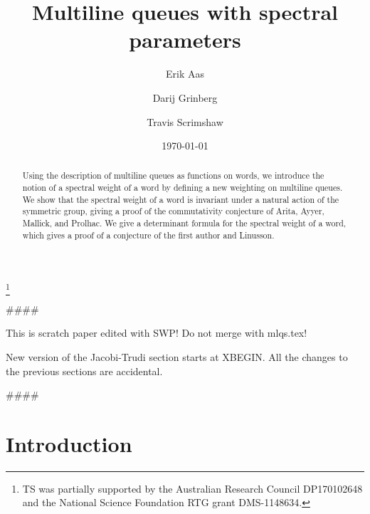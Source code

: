 \documentclass[reqno]{amsart}%
\newcommand{\0}{\phantom{c}}
\theoremstyle{plain}
\theoremstyle{definition}
\numberwithin{equation}{section}
\begin{document}
\title[MLQs]{Multiline queues with spectral parameters}
\author[E.~Aas]{Erik Aas}
\address[E. Aas]{Department of Mathematics, Pennsylvania State University, McAllister
Building, State College, PA 116802, USA}
\author[D.~Grinberg]{Darij Grinberg}
\address[D. Grinberg]{School of Mathematics, University of Minnesota, 206 Church St.
SE, Minneapolis, MN 55455}
\author[T.~Scrimshaw]{Travis Scrimshaw}
\address[T. Scrimshaw]{School of Mathematics and Physics, The University of Queensland,
St. Lucia, QLD 4072, Australia}
\thanks{TS was partially supported by the Australian Research Council DP170102648 and
the National Science Foundation RTG grant DMS-1148634.}
\date{\today}

\begin{abstract}
Using the description of multiline queues as functions on words, we introduce
the notion of a spectral weight of a word by defining a new weighting on
multiline queues. We show that the spectral weight of a word is invariant
under a natural action of the symmetric group, giving a proof of the
commutativity conjecture of Arita, Ayyer, Mallick, and Prolhac. We give a
determinant formula for the spectral weight of a word, which gives a proof of
a conjecture of the first author and Linusson.

\end{abstract}
\maketitle


\#\#\#\#

This is scratch paper edited with SWP! Do not merge with mlqs.tex!

New version of the Jacobi-Trudi section starts at XBEGIN. All the changes to
the previous sections are accidental.

\#\#\#\#



\section{Introduction}

\label{sec:introduction}
\end{document}
